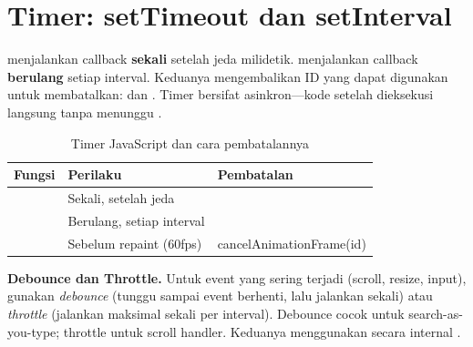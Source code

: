 ﻿\section{Timer: setTimeout dan setInterval}

 menjalankan callback \textbf{sekali} setelah jeda milidetik.  menjalankan callback \textbf{berulang} setiap interval. Keduanya mengembalikan ID yang dapat digunakan untuk membatalkan:  dan . Timer bersifat asinkron---kode setelah  dieksekusi langsung tanpa menunggu \cite{jsInfo}.

\begin{table}[H]
\centering
\small
\begin{tabular}{|P{4cm}|P{3.2cm}|P{2.8cm}|}
\hline
\textbf{Fungsi} & \textbf{Perilaku} & \textbf{Pembatalan} \\
\hline
{} & Sekali, setelah jeda &  \\
\hline
{} & Berulang, setiap interval &  \\
\hline
{} & Sebelum repaint (60fps) & \parbox[t]{2.8cm}{\raggedright\ttfamily\footnotesize cancelAnimationFrame(id)} \\
\hline
\end{tabular}
\caption{Timer JavaScript dan cara pembatalannya}
\end{table}

\begin{konsep}
\textbf{Debounce dan Throttle.} Untuk event yang sering terjadi (scroll, resize, input), gunakan \textit{debounce} (tunggu sampai event berhenti, lalu jalankan sekali) atau \textit{throttle} (jalankan maksimal sekali per interval). Debounce cocok untuk search-as-you-type; throttle untuk scroll handler. Keduanya menggunakan  secara internal \cite{mdnJsGuide}.
\end{konsep}

